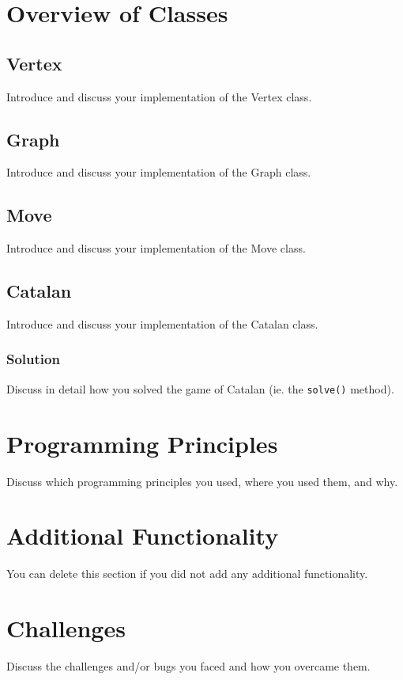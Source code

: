 \documentclass{article}
\begin{document}
\section{Overview of Classes}

\subsection{Vertex}
Introduce and discuss your implementation of the Vertex class.

\subsection{Graph}
Introduce and discuss your implementation of the Graph class.

\subsection{Move}
Introduce and discuss your implementation of the Move class.

\subsection{Catalan}
Introduce and discuss your implementation of the Catalan class.

\subsubsection{Solution}
Discuss in detail how you solved the game of Catalan (ie. the \texttt{solve()} method).

\section{Programming Principles}
Discuss which programming principles you used, where you used them, and why.

\section{Additional Functionality}
You can delete this section if you did not add any additional functionality.

\section{Challenges}
Discuss the challenges and/or bugs you faced and how you overcame them.
\end{document}

